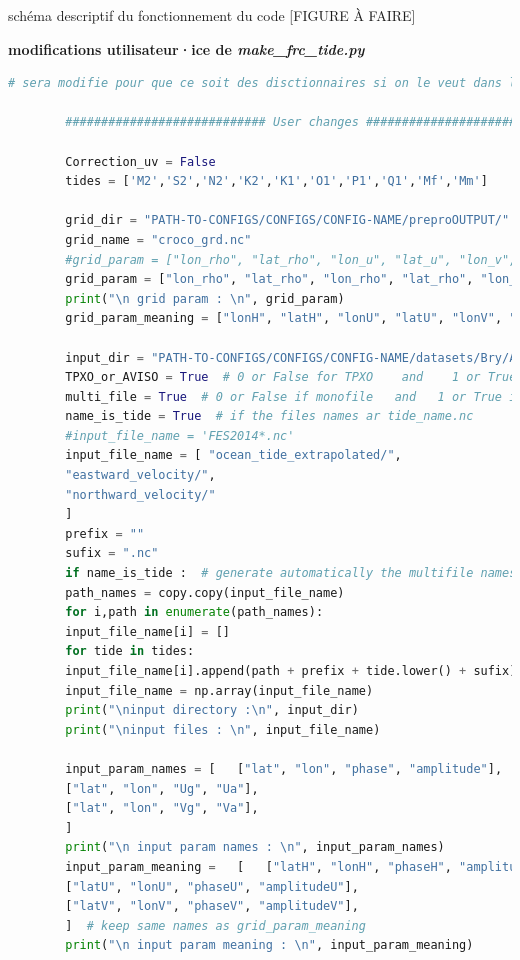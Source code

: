 \documentclass[10pt,a4paper,titlepage]{article}
\begin{document}
schéma descriptif du fonctionnement du code [FIGURE À FAIRE]

\begin{codeEnv}{\textbf{modifications utilisateur·ice de \textit{make\_frc\_tide.py}}}
    \begin{lstlisting}[language=python]
        # sera modifie pour que ce soit des disctionnaires si on le veut dans le rapport

        ############################ User changes ############################

        Correction_uv = False
        tides = ['M2','S2','N2','K2','K1','O1','P1','Q1','Mf','Mm']

        grid_dir = "PATH-TO-CONFIGS/CONFIGS/CONFIG-NAME/preproOUTPUT/"
        grid_name = "croco_grd.nc"
        #grid_param = ["lon_rho", "lat_rho", "lon_u", "lat_u", "lon_v", "lat_v"]
        grid_param = ["lon_rho", "lat_rho", "lon_rho", "lat_rho", "lon_rho", "lat_rho"]
        print("\n grid param : \n", grid_param)
        grid_param_meaning = ["lonH", "latH", "lonU", "latU", "lonV", "latV"]  # don't change this order

        input_dir = "PATH-TO-CONFIGS/CONFIGS/CONFIG-NAME/datasets/Bry/AVISO/"
        TPXO_or_AVISO = True  # 0 or False for TPXO    and    1 or True for AVISO
        multi_file = True  # 0 or False if monofile   and   1 or True if multifile
        name_is_tide = True  # if the files names ar tide_name.nc
        #input_file_name = 'FES2014*.nc'
        input_file_name = [ "ocean_tide_extrapolated/",
        "eastward_velocity/",
        "northward_velocity/"
        ]
        prefix = ""
        sufix = ".nc"
        if name_is_tide :  # generate automatically the multifile names
        path_names = copy.copy(input_file_name)
        for i,path in enumerate(path_names):
        input_file_name[i] = []
        for tide in tides:
        input_file_name[i].append(path + prefix + tide.lower() + sufix)
        input_file_name = np.array(input_file_name)
        print("\ninput directory :\n", input_dir)
        print("\ninput files : \n", input_file_name)

        input_param_names = [   ["lat", "lon", "phase", "amplitude"],
        ["lat", "lon", "Ug", "Ua"],
        ["lat", "lon", "Vg", "Va"],
        ]
        print("\n input param names : \n", input_param_names)
        input_param_meaning =   [   ["latH", "lonH", "phaseH", "amplitudeH"],
        ["latU", "lonU", "phaseU", "amplitudeU"],
        ["latV", "lonV", "phaseV", "amplitudeV"],
        ]  # keep same names as grid_param_meaning
        print("\n input param meaning : \n", input_param_meaning)


\end{lstlisting}
\end{codeEnv}
\end{document}
